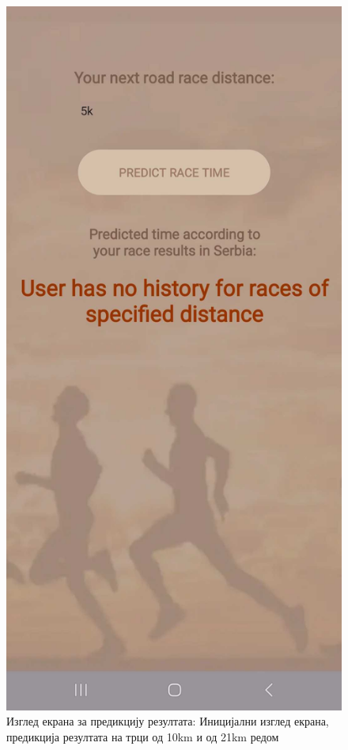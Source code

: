\documentclass[12pt,oneside]{memoir}
\begin{document}
\begin{figure}[H]
\begin{minipage}{0.27\textwidth}
  \end{minipage}
  \caption{Изглед екрана за предикцију резултата: Иницијални изглед екрана, предикција резултата на трци од 10km и од 21km редом}
  \vfill
  \begin{minipage}{0.25\textwidth}
    \centering
    \includegraphics[width=\textwidth]{assets/pictures/app_screenshots/race_prediction_3.jpg}

\end{minipage}
\end{figure}
\end{document}
